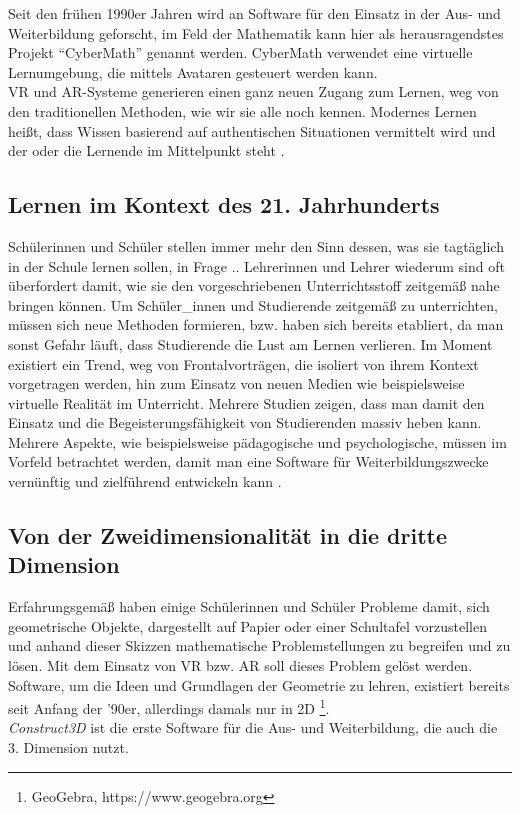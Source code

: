\documentclass[deutsch]{llncs}
\begin{document}
Seit den frühen 1990er Jahren wird an Software für den Einsatz in der Aus- und Weiterbildung geforscht, im Feld der Mathematik kann hier als herausragendstes Projekt ``CyberMath'' genannt werden. CyberMath verwendet eine virtuelle Lernumgebung, die mittels Avataren gesteuert werden kann. \\
VR und AR-Systeme generieren einen ganz neuen Zugang zum Lernen, weg von den traditionellen Methoden, wie wir sie alle noch kennen. Modernes Lernen heißt, dass Wissen basierend auf authentischen Situationen vermittelt wird und der oder die Lernende im Mittelpunkt steht \cite{Klampfer}.
\cite{unknown}

\subsection{Lernen im Kontext des 21. Jahrhunderts}
Schülerinnen und Schüler stellen immer mehr den Sinn dessen, was sie tagtäglich in der Schule lernen sollen, in Frage \cite{Klampfer}.. Lehrerinnen und Lehrer wiederum sind oft überfordert damit, wie sie den vorgeschriebenen Unterrichtsstoff zeitgemäß nahe bringen können. Um Schüler\_innen und Studierende zeitgemäß zu unterrichten, müssen sich neue Methoden formieren, bzw. haben sich bereits etabliert, da man sonst Gefahr läuft, dass Studierende die Lust am Lernen verlieren. Im Moment existiert ein Trend, weg von Frontalvorträgen, die isoliert von ihrem Kontext vorgetragen werden, hin zum Einsatz von neuen Medien wie beispielsweise virtuelle Realität im Unterricht. Mehrere Studien \cite{Hu-Au} zeigen, dass man damit den Einsatz und die Begeisterungsfähigkeit von Studierenden massiv heben kann.
Mehrere Aspekte, wie beispielsweise pädagogische und psychologische, müssen im Vorfeld betrachtet werden, damit man eine Software für Weiterbildungszwecke vernünftig und zielführend entwickeln kann \cite{article}.
\subsection{Von der Zweidimensionalität in die dritte Dimension}
Erfahrungsgemäß haben einige Schülerinnen und Schüler Probleme damit, sich geometrische Objekte, dargestellt auf Papier oder einer Schultafel vorzustellen und anhand dieser Skizzen mathematische Problemstellungen zu begreifen und zu lösen. Mit dem Einsatz von VR bzw. AR soll dieses Problem gelöst werden.\\
Software, um die Ideen und Grundlagen der Geometrie zu lehren, existiert bereits seit Anfang der '90er, allerdings damals nur in 2D \footnote{GeoGebra, https://www.geogebra.org}. \\
\emph{Construct3D} ist die erste Software für die Aus- und Weiterbildung, die auch die 3. Dimension nutzt. %
\end{document}
